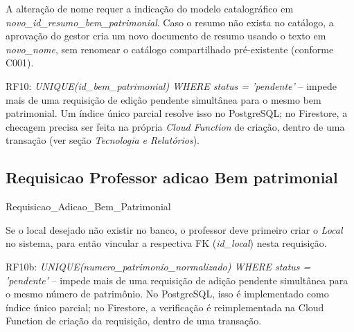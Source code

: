\begin{explicacao}
A alteração de nome requer a indicação do modelo catalográfico em \textit{novo\_id\_resumo\_bem\_patrimonial}. Caso o resumo não exista no catálogo, a aprovação do gestor cria um novo documento de resumo usando o texto em \textit{novo\_nome}, sem renomear o catálogo compartilhado pré-existente (conforme C001).
\end{explicacao}

\begin{regra}
RF10: \textit{UNIQUE(id\_bem\_patrimonial) WHERE status = 'pendente'} -- impede mais de uma requisição de edição pendente simultânea para o mesmo bem patrimonial. Um índice único parcial resolve isso no PostgreSQL; no Firestore, a checagem precisa ser feita na própria \textit{Cloud Function} de criação, dentro de uma transação (ver seção \textit{Tecnologia e Relatórios}).
\end{regra}
\newpage
\subsection{Requisicao Professor adicao Bem patrimonial}
\begin{entidade}{Requisicao\_Adicao\_Bem\_Patrimonial}
\end{entidade}

\begin{explicacao}
Se o local desejado não existir no banco, o professor deve primeiro criar o \textit{Local} no sistema, para então vincular a respectiva FK (\textit{id\_local}) nesta requisição.
\end{explicacao}
\begin{regra}
RF10b: \textit{UNIQUE(numero\_patrimonio\_normalizado) WHERE status = 'pendente'} --
impede mais de uma requisição de adição pendente simultânea para o mesmo
número de patrimônio. No PostgreSQL, isso é implementado como índice
único parcial; no Firestore, a verificação é reimplementada na Cloud
Function de criação da requisição, dentro de uma transação.
\end{regra}
